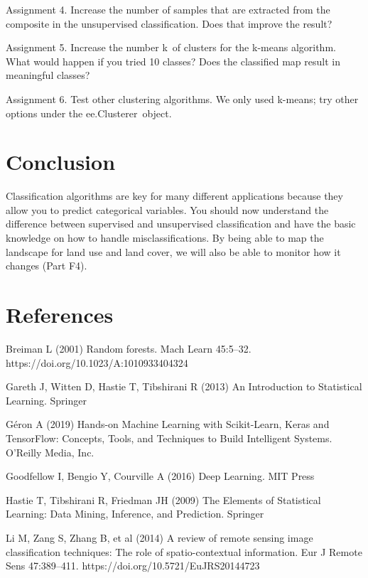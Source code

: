 \documentclass[
  letterpaper,
  DIV=11,
  numbers=noendperiod]{scrreprt}
\begin{document}
Assignment 4. Increase the number of samples that are extracted from the
composite in the unsupervised classification. Does that improve the
result?

Assignment 5. Increase the number k~of clusters for the k-means
algorithm. What would happen if you tried 10 classes? Does the
classified map result in meaningful classes?

Assignment 6. Test other clustering algorithms. We only used k-means;
try other options under the ee.Clusterer~object.

\hypertarget{conclusion-5}{%
\section*{Conclusion}\label{conclusion-5}}


Classification algorithms are key for many different applications
because they allow you to predict categorical variables. You should now
understand the difference between supervised and unsupervised
classification and have the basic knowledge on how to handle
misclassifications. By being able to map the landscape for land use and
land cover, we will also be able to monitor how it changes (Part F4).

\hypertarget{references-3}{%
\section*{References}\label{references-3}}


Breiman L (2001) Random forests. Mach Learn 45:5--32.
https://doi.org/10.1023/A:1010933404324

Gareth J, Witten D, Hastie T, Tibshirani R (2013) An Introduction to
Statistical Learning. Springer

Géron A (2019) Hands-on Machine Learning with Scikit-Learn, Keras and
TensorFlow: Concepts, Tools, and Techniques to Build Intelligent
Systems. O'Reilly Media, Inc.

Goodfellow I, Bengio Y, Courville A (2016) Deep Learning. MIT Press

Hastie T, Tibshirani R, Friedman JH (2009) The Elements of Statistical
Learning: Data Mining, Inference, and Prediction. Springer

Li M, Zang S, Zhang B, et al (2014) A review of remote sensing image
classification techniques: The role of spatio-contextual information.
Eur J Remote Sens 47:389--411. https://doi.org/10.5721/EuJRS20144723
\end{document}
